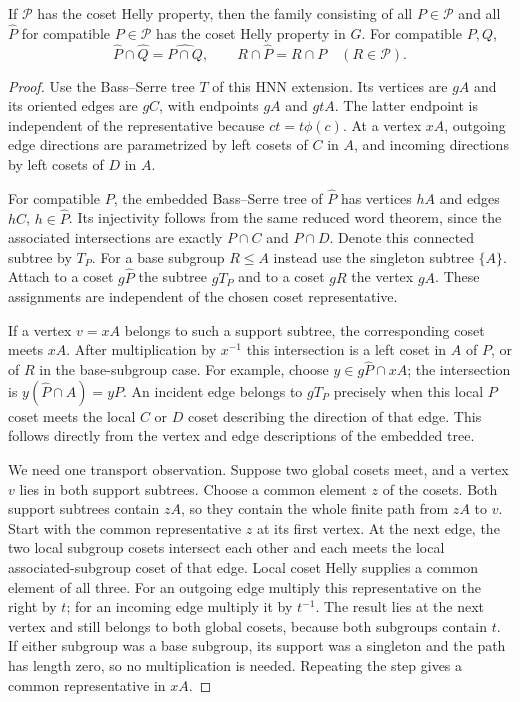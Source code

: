 \begin{theorem}\label{H-thm:helly}
If $\mathcal P$ has the coset Helly property, then the family consisting
of all $P\in\mathcal P$ and all $\widehat P$ for compatible
$P\in\mathcal P$ has the coset Helly property in $G$.
For compatible $P,Q$,
\[
 \widehat P\cap\widehat Q=\widehat{P\cap Q},\qquad
 R\cap\widehat P=R\cap P\quad(R\in\mathcal P).
\]
\end{theorem}
\begin{proof}
Use the Bass--Serre tree $T$ of this HNN extension. Its vertices are
$gA$ and its oriented edges are $gC$, with endpoints $gA$ and $gtA$.
The latter endpoint is independent of the representative because
$ct=t\phi(c)$. At a vertex $xA$, outgoing edge directions are
parametrized by left cosets of $C$ in $A$, and incoming directions by
left cosets of $D$ in $A$.

For compatible $P$, the embedded Bass--Serre tree of $\widehat P$ has
vertices $hA$ and edges $hC$, $h\in\widehat P$. Its injectivity follows
from the same reduced word theorem, since the associated intersections
are exactly $P\cap C$ and $P\cap D$. Denote this connected subtree by
$T_P$. For a base subgroup $R\leq A$ instead use the singleton subtree
$\{A\}$. Attach to a coset $g\widehat P$ the subtree $gT_P$ and to a
coset $gR$ the vertex $gA$. These assignments are independent of the
chosen coset representative.

If a vertex $v=xA$ belongs to such a support subtree, the corresponding
coset meets $xA$. After multiplication by $x^{-1}$ this intersection is
a left coset in $A$ of $P$, or of $R$ in the base-subgroup case.
For example, choose $y\in g\widehat P\cap xA$; the intersection is
$y(\widehat P\cap A)=yP$. An incident edge belongs to $gT_P$ precisely
when this local $P$ coset meets the local $C$ or $D$ coset describing
the direction of that edge. This follows directly from the vertex and
edge descriptions of the embedded tree.

We need one transport observation. Suppose two global cosets meet, and
a vertex $v$ lies in both support subtrees. Choose a common element $z$
of the cosets. Both support subtrees contain $zA$, so they contain the
whole finite path from $zA$ to $v$. Start with the common representative
$z$ at its first vertex. At the next edge, the two local subgroup cosets
intersect each other and each meets the local associated-subgroup coset
of that edge. Local coset Helly supplies a common element of all three.
For an outgoing edge multiply this representative on the right by $t$;
for an incoming edge multiply it by $t^{-1}$. The result lies at the
next vertex and still belongs to both global cosets, because both
subgroups contain $t$. If either subgroup was a base subgroup, its
support was a singleton and the path has length zero, so no multiplication
is needed. Repeating the step gives a common representative in $xA$.


\end{proof}
